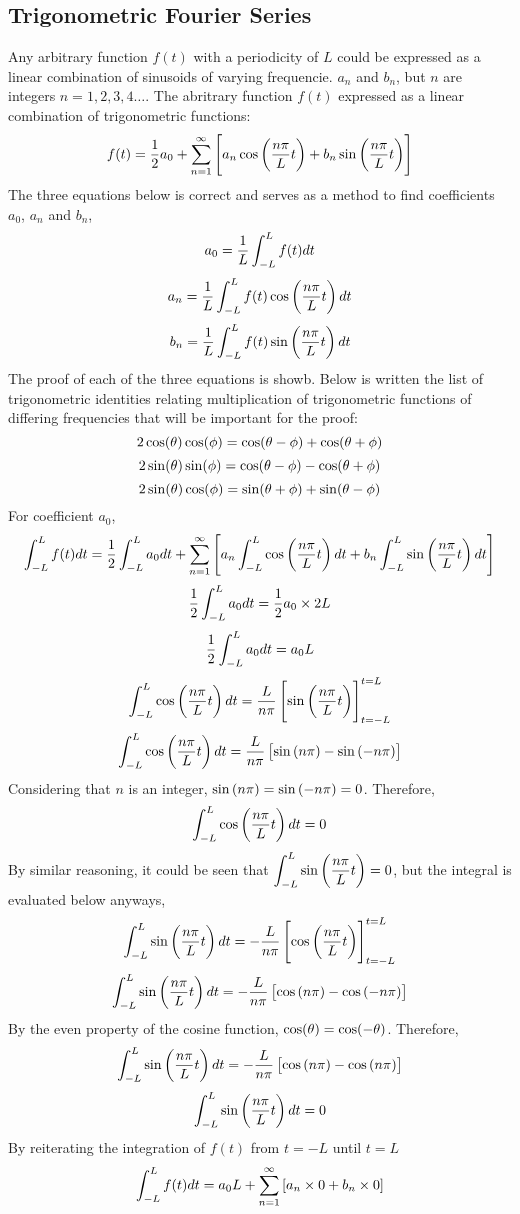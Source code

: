 \documentclass[a4paper, 12pt]{report}
\begin{document}
\begin{center}
\section{Trigonometric Fourier Series}
\begin{comment}
\end{comment}
Any arbitrary function $f(t)$ with a periodicity of $L$ could be expressed as a linear combination of sinusoids of varying frequencie. $a_n$ and $b_n$, but $n$ are integers $n = 1,2,3,4\dots$. The abritrary function $f(t)$ expressed as a linear combination of trigonometric functions:
$$f(t) = \frac{1}{2}a_0 + \sum_{n = 1}^{\infty}\left[a_n \cos\left(\frac{n\pi}{L}t\right) + b_n \sin\left(\frac{n\pi}{L}t\right)\right]$$
The three equations below is correct and serves as a method to find coefficients $a_0$, $a_n$ and $b_n$,
$$a_0 = \frac{1}{L}\int_{-L}^{L}f(t)dt$$
$$a_n = \frac{1}{L}\int_{-L}^{L}f(t)\cos\left(\frac{n\pi}{L}t\right)dt$$
$$b_n = \frac{1}{L}\int_{-L}^{L}f(t)\sin\left(\frac{n\pi}{L}t\right)dt$$
The proof of each of the three equations is showb. Below is written the list of trigonometric identities relating multiplication of trigonometric functions of differing frequencies that will be important for the proof:
$$2\cos(\theta)\cos(\phi) = \cos(\theta - \phi) + \cos(\theta + \phi)$$ 
$$2\sin(\theta)\sin(\phi) = \cos(\theta - \phi) - \cos(\theta + \phi)$$
$$2\sin(\theta)\cos(\phi) = \sin(\theta + \phi) + \sin(\theta - \phi)$$
For coefficient $a_0$,
$$\int_{-L}^{L}f(t)dt = \frac{1}{2} \int_{-L}^{L}a_0dt + \sum_{n = 1}^{\infty}\left[a_n \int_{-L}^{L}\cos\left(\frac{n\pi}{L}t\right)dt + b_n \int_{-L}^{L}\sin\left(\frac{n\pi}{L}t\right)dt\right]$$
$$\frac{1}{2} \int_{-L}^{L}a_0dt = \frac{1}{2}a_0\times2L$$
$$\frac{1}{2} \int_{-L}^{L}a_0dt = a_0L$$
$$\int_{-L}^{L}\cos\left(\frac{n\pi}{L}t\right)dt = \frac{L}{n\pi}\left[\sin\left(\frac{n\pi}{L}t\right)\right]^{t = L}_{t = -L}$$
$$\int_{-L}^{L}\cos\left(\frac{n\pi}{L}t\right)dt = \frac{L}{n\pi}\left[\sin\left(n\pi\right) - \sin\left(-n\pi\right)\right]$$
Considering that $n$ is an integer, $\sin\left(n\pi\right) = \sin\left(-n\pi\right) = 0$. Therefore, 
$$\int_{-L}^{L}\cos\left(\frac{n\pi}{L}t\right)dt = 0$$
By similar reasoning, it could be seen that $\displaystyle{\int_{-L}^{L}\sin\left(\frac{n\pi}{L}t\right) = 0}$, but the integral is evaluated below anyways,
$$\int_{-L}^{L}\sin\left(\frac{n\pi}{L}t\right)dt = -\frac{L}{n\pi}\left[\cos\left(\frac{n\pi}{L}t\right)\right]^{t = L}_{t = -L}$$
$$\int_{-L}^{L}\sin\left(\frac{n\pi}{L}t\right)dt = -\frac{L}{n\pi}\left[\cos\left(n\pi\right) - \cos\left(-n\pi\right)\right]$$
By the even property of the cosine function, $\cos(\theta) = \cos(-\theta)$. Therefore,
$$\int_{-L}^{L}\sin\left(\frac{n\pi}{L}t\right)dt = -\frac{L}{n\pi}\left[\cos\left(n\pi\right) - \cos\left(n\pi\right)\right]$$
$$\int_{-L}^{L}\sin\left(\frac{n\pi}{L}t\right)dt = 0$$
By reiterating the integration of $f(t)$ from $t = -L$ until $t = L$
$$\int_{-L}^{L}f(t)dt = a_0L + \sum_{n = 1}^{\infty}\left[a_n\times 0 + b_n \times 0\right]$$

\end{center}
\end{document}
